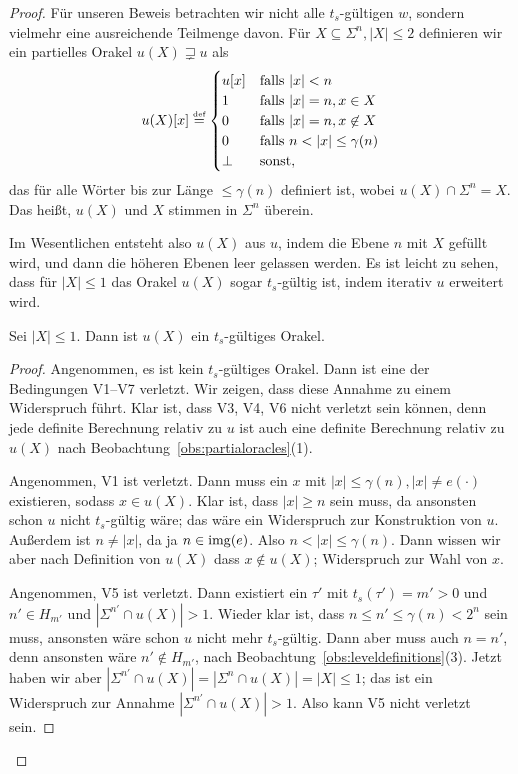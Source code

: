 \begin{proof}
Für unseren Beweis betrachten wir nicht alle $t_{s}$-gültigen $w$, sondern vielmehr eine ausreichende Teilmenge davon.
Für $X \subseteq \Sigma^n, |X|\leq 2$ definieren wir ein partielles Orakel $u(X)\sqsupsetneq u$ als
\[
    u(X)[x] \defeq \begin{cases} u[x] & \text{falls $|x|< n$}\\
    1 & \text{falls $|x|=n, x\in X$}\\
    0 & \text{falls $|x|=n, x\not\in X$}\\
    0 & \text{falls $n<|x|\leq \gamma(n)$} \\ \bot & \text{sonst}, \end{cases}
\]
das für alle Wörter bis zur Länge $\leq\gamma(n)$ definiert ist, wobei $u(X) \cap \Sigma^n = X$. Das heißt, $u(X)$ und $X$ stimmen in $\Sigma^n$ überein.

Im Wesentlichen entsteht also $u(X)$ aus $u$, indem die Ebene $n$ mit $X$ gefüllt wird, und dann die höheren Ebenen leer gelassen werden.
Es ist leicht zu sehen, dass für $|X|\leq 1$ das Orakel $u(X)$ sogar $t_{s}$-gültig ist, indem iterativ $u$ erweitert wird.

\begin{claim}\label{claim:myoracle-validty-leq1}
    Sei $|X|\leq 1$. Dann ist $u(X)$ ein $t_{s}$-gültiges Orakel.
\end{claim}
\begin{proof}
    Angenommen, es ist kein $t_{s}$-gültiges Orakel. Dann ist eine der Bedingungen V1–V7 verletzt. Wir zeigen, dass diese Annahme zu einem Widerspruch führt.
    Klar ist, dass V3, V4, V6 nicht verletzt sein können, denn jede definite Berechnung relativ zu $u$ ist auch eine definite Berechnung relativ zu $u(X)$ nach Beobachtung~\ref{obs:partialoracles}(1).

    Angenommen, V1 ist verletzt. Dann muss ein $x$ mit $|x|\leq \gamma(n), |x|\neq e(\cdot)$ existieren, sodass $x\in u(X)$.
    Klar ist, dass $|x|\geq n$ sein muss, da ansonsten schon $u$ nicht $t_{s}$-gültig wäre; das wäre ein Widerspruch zur Konstruktion von $u$. Außerdem ist $n\neq |x|$, da ja $n\in\operatorname{img}(e)$.
    Also $n<|x|\leq \gamma(n)$. Dann wissen wir aber nach Definition von $u(X)$ dass $x\not\in u(X)$; Widerspruch zur Wahl von $x$.

    Angenommen, V5 ist verletzt. Dann existiert ein $\tau'$ mit $t_{s}(\tau')=m'>0$ und $n'\in H_{m'}$ und $|\Sigma^{n'}\cap u(X)|>1$. Wieder klar ist, dass $n\leq n'\leq\gamma(n)<2^n$ sein muss, ansonsten wäre schon $u$ nicht mehr $t_{s}$-gültig.
    Dann aber muss auch $n=n'$, denn ansonsten wäre $n'\not\in H_{m'}$, nach Beobachtung~\ref{obs:leveldefinitions}(3).
    Jetzt haben wir aber $|\Sigma^{n'}\cap u(X)|=|\Sigma^n\cap u(X)| = |X|\leq 1$; das ist ein Widerspruch zur Annahme $|\Sigma^{n'}\cap u(X)|>1$. Also kann V5 nicht verletzt sein. 


\end{proof}
\end{proof}
